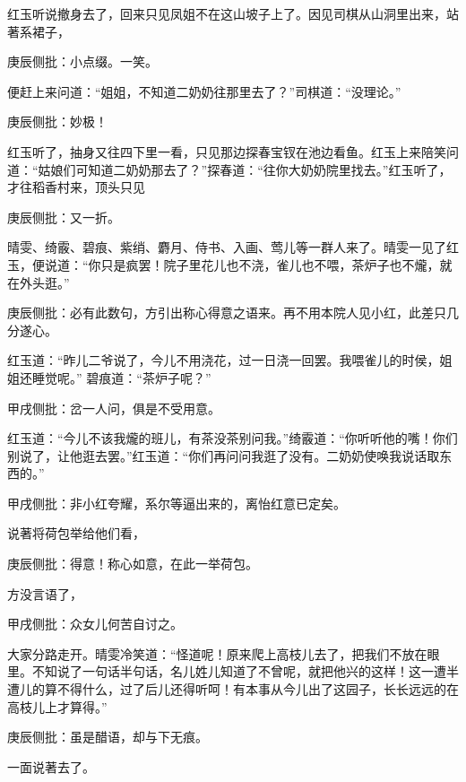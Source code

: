 \begin{parag}
    红玉听说撤身去了，回来只见凤姐不在这山坡子上了。因见司棋从山洞里出来，站著系裙子，\begin{note}庚辰侧批：小点缀。一笑。\end{note}便赶上来问道：“姐姐，不知道二奶奶往那里去了？”司棋道：“没理论。”\begin{note}庚辰侧批：妙极！\end{note}红玉听了，抽身又往四下里一看，只见那边探春宝钗在池边看鱼。红玉上来陪笑问道：“姑娘们可知道二奶奶那去了？”探春道：“往你大奶奶院里找去。”红玉听了，才往稻香村来，顶头只见\begin{note}庚辰侧批：又一折。\end{note} 晴雯、绮霰、碧痕、紫绡、麝月、侍书、入画、莺儿等一群人来了。晴雯一见了红玉，便说道：“你只是疯罢！院子里花儿也不浇，雀儿也不喂，茶炉子也不爖，就在外头逛。”\begin{note}庚辰侧批：必有此数句，方引出称心得意之语来。再不用本院人见小红，此差只几分遂心。\end{note} 红玉道：“昨儿二爷说了，今儿不用浇花，过一日浇一回罢。我喂雀儿的时侯，姐姐还睡觉呢。” 碧痕道：“茶炉子呢？”\begin{note}甲戌侧批：岔一人问，俱是不受用意。\end{note}红玉道：“今儿不该我爖的班儿，有茶没茶别问我。”绮霰道：“你听听他的嘴！你们别说了，让他逛去罢。”红玉道：“你们再问问我逛了没有。二奶奶使唤我说话取东西的。”\begin{note}甲戌侧批：非小红夸耀，系尔等逼出来的，离怡红意已定矣。\end{note}说著将荷包举给他们看，\begin{note}庚辰侧批：得意！称心如意，在此一举荷包。\end{note}方没言语了， \begin{note}甲戌侧批：众女儿何苦自讨之。\end{note}大家分路走开。晴雯冷笑道：“怪道呢！原来爬上高枝儿去了，把我们不放在眼里。不知说了一句话半句话，名儿姓儿知道了不曾呢，就把他兴的这样！这一遭半遭儿的算不得什么，过了后儿还得听呵！有本事从今儿出了这园子，长长远远的在高枝儿上才算得。”\begin{note}庚辰侧批：虽是醋语，却与下无痕。\end{note}一面说著去了。
\end{parag}


